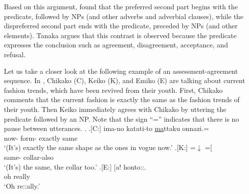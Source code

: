 Based on this argument,
 found that the preferred second part begins with the predicate, followed by NPs (and other adverbs and adverbial clauses),
while the dispreferred second part ends with the predicate,
preceded by NPs (and other elements).
Tanaka argues that this contrast is observed because
the predicate expresses the conclusion such as agreement, disagreement, acceptance, and refusal.

Let us take a closer look at the following example of an assessment-agreement sequence.
In \Next,
Chikako (C), Keiko (K), and Emiko (E) are talking about current fashion trends, which have been revived from their youth.
First, Chikako comments that the current fashion is exactly the same as the fashion trends of their youth.
Then Keiko immediately agrees with Chikako
by uttering the predicate followed by an NP.
Note that the sign ``='' indicates that there is no pause between utterances.
%
\ex.
 \ag.[C:] ima-no katati-to \ul{ma}ttaku onnazi.= \\
                now- form- exactly same \\
                `(It's) exactly the same shape as the ones in vogue now.'
 \bg.[K:] =$\downarrow$ =[ \\
          \hspace{0.2cm}same- \hspace{0.3cm}collar-also \\
          `(It's) the same, the collar too.'
 \bg.[E:] {\hspace{2.5cm}} [a! honto::. \\
          {} oh really \\
          {\hspace{2.5cm}}`Oh re::ally.'
          \hfill{\cite[406]{tanaka05}}

